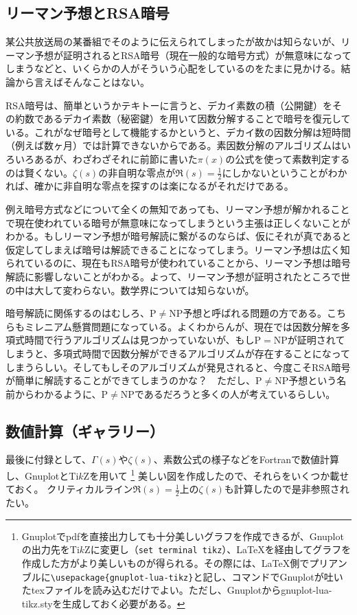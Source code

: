 \documentclass[11pt,b5paper,papersize,dvipdfmx]{jsbook}
\begin{document}
\subsection{リーマン予想とRSA暗号}
某公共放送局の某番組でそのように伝えられてしまったが故かは知らないが、リーマン予想が証明されるとRSA暗号（現在一般的な暗号方式）が無意味になってしまうなどと、いくらかの人がそういう心配をしているのをたまに見かける。結論から言えばそんなことはない。\par
RSA暗号は、簡単というかテキトーに言うと、デカイ素数の積（公開鍵）をその約数であるデカイ素数（秘密鍵）を用いて因数分解することで暗号を復元している。これがなぜ暗号として機能するかというと、デカイ数の因数分解は短時間（例えば数ヶ月）では計算できないからである。素因数分解のアルゴリズムはいろいろあるが、わざわざそれに前節に書いた$\pi(x)$の公式を使って素数判定するのは賢くない。$\zeta(s)$の非自明な零点が$\Re(s)=\frac12$にしかないということがわかれば、確かに非自明な零点を探すのは楽になるがそれだけである。\par
例え暗号方式などについて全くの無知であっても、リーマン予想が解かれることで現在使われている暗号が無意味になってしまうという主張は正しくないことがわかる。もしリーマン予想が暗号解読に繋がるのならば、仮にそれが真であると仮定してしまえば暗号は解読できることになってしまう。リーマン予想は広く知られているのに、現在もRSA暗号が使われていることから、リーマン予想は暗号解読に影響しないことがわかる。よって、リーマン予想が証明されたところで世の中は大して変わらない。数学界については知らないが。\par
暗号解読に関係するのはむしろ、$\mathrm{P}\ne\mathrm{NP}$予想と呼ばれる問題の方である。こちらもミレニアム懸賞問題になっている。よくわからんが、現在では因数分解を多項式時間で行うアルゴリズムは見つかっていないが、もし$\mathrm{P}=\mathrm{NP}$が証明されてしまうと、多項式時間で因数分解ができるアルゴリズムが存在することになってしまうらしい。そしてもしそのアルゴリズムが発見されると、今度こそRSA暗号が簡単に解読することができてしまうのかな？　ただし、$\mathrm{P}\ne\mathrm{NP}$予想という名前からわかるように、$\mathrm{P}\ne\mathrm{NP}$であるだろうと多くの人が考えているらしい。



\subsection{数値計算（ギャラリー）}
最後に付録として、$\Gamma(s)$や$\zeta(s)$、素数公式の様子などをFortranで数値計算し、GnuplotとTi$k$Zを用いて
\footnote{
  Gnuplotでpdfを直接出力しても十分美しいグラフを作成できるが、Gnuplotの出力先をTi$k$Zに変更し（\verb|set terminal tikz|）、\LaTeX を経由してグラフを作成した方がより美しいものが得られる。その際には、\LaTeX 側でプリアンブルに\verb|\usepackage{gnuplot-lua-tikz}|と記し、\verb||コマンドでGnuplotが吐いたtexファイルを読み込むだけでよい。ただし、Gnuplotからgnuplot-lua-tikz.styを生成しておく必要がある。
  }
美しい図を作成したので、それらをいくつか載せておく。
クリティカルライン$\Re(s)=\frac12$上の$\zeta(s)$も計算したので是非参照されたい。
\end{document}
